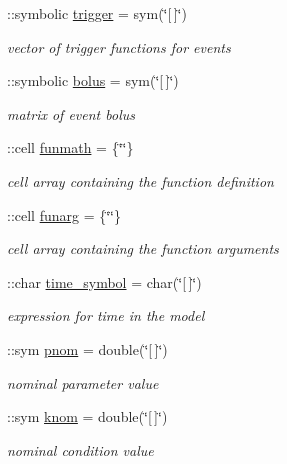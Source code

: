 \begin{DoxyCompactItemize}
\+::symbolic \hyperlink{class_s_b_m_lode_ae194cb817eae4085f8023885100c68dd}{trigger} = sym(\char`\"{}\mbox{[}$\,$\mbox{]}\char`\"{})
\begin{DoxyCompactList}\small\item\em vector of trigger functions for events \end{DoxyCompactList}\item 
\+::symbolic \hyperlink{class_s_b_m_lode_ab9227561ac246ee4b70f9e65c25ffda7}{bolus} = sym(\char`\"{}\mbox{[}$\,$\mbox{]}\char`\"{})
\begin{DoxyCompactList}\small\item\em matrix of event bolus \end{DoxyCompactList}\item 
\+::cell \hyperlink{class_s_b_m_lode_a9c1cb6154a226c993c60010300a62e34}{funmath} = \{\char`\"{}\char`\"{}\}
\begin{DoxyCompactList}\small\item\em cell array containing the function definition \end{DoxyCompactList}\item 
\+::cell \hyperlink{class_s_b_m_lode_ae492d28f363cbbf0c960cab4e8911761}{funarg} = \{\char`\"{}\char`\"{}\}
\begin{DoxyCompactList}\small\item\em cell array containing the function arguments \end{DoxyCompactList}\item 
\+::char \hyperlink{class_s_b_m_lode_ac38903669f208bc49c971c7a69f62225}{time\+\_\+symbol} = char(\char`\"{}\mbox{[}$\,$\mbox{]}\char`\"{})
\begin{DoxyCompactList}\small\item\em expression for time in the model \end{DoxyCompactList}\item 
\+::sym \hyperlink{class_s_b_m_lode_aab64bc684d10326610cc4e866d7ed65c}{pnom} = double(\char`\"{}\mbox{[}$\,$\mbox{]}\char`\"{})
\begin{DoxyCompactList}\small\item\em nominal parameter value \end{DoxyCompactList}\item 
\+::sym \hyperlink{class_s_b_m_lode_a744d356a79732f2b65d02f220c580dd4}{knom} = double(\char`\"{}\mbox{[}$\,$\mbox{]}\char`\"{})
\begin{DoxyCompactList}\small\item\em nominal condition value \end{DoxyCompactList}\end{DoxyCompactItemize}


